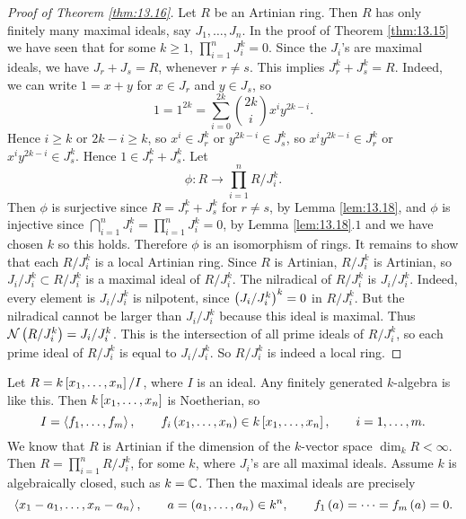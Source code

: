 \begin{proof}[Proof of Theorem \ref{thm:13.16}]
Let $ R $ be an Artinian ring. Then $ R $ has only finitely many maximal ideals, say $ J_1, \dots, J_n $. In the proof of Theorem \ref{thm:13.15} we have seen that for some $ k \ge 1 $, $ \prod_{i = 1}^n J_i^k = 0 $. Since the $ J_i $'s are maximal ideals, we have $ J_r + J_s = R $, whenever $ r \ne s $. This implies $ J_r^k + J_s^k = R $. Indeed, we can write $ 1 = x + y $ for $ x \in J_r $ and $ y \in J_s $, so
$$ 1 = 1^{2k} = \sum_{i = 0}^{2k} \binom{2k}{i}x^iy^{2k - i}. $$
Hence $ i \ge k $ or $ 2k - i \ge k $, so $ x^i \in J_r^k $ or $ y^{2k - i} \in J_s^k $, so $ x^iy^{2k - i} \in J_r^k $ or $ x^iy^{2k - i} \in J_s^k $. Hence $ 1 \in J_r^k + J_s^k $. Let
$$ \phi : R \to \prod_{i = 1}^n R / J_i^k. $$
Then $ \phi $ is surjective since $ R = J_r^k + J_s^k $ for $ r \ne s $, by Lemma \ref{lem:13.18}, and $ \phi $ is injective since $ \bigcap_{i = 1}^n J_i^k = \prod_{i = 1}^n J_i^k = 0 $, by Lemma \ref{lem:13.18}.$ 1 $ and we have chosen $ k $ so this holds. Therefore $ \phi $ is an isomorphism of rings. It remains to show that each $ R / J_i^k $ is a local Artinian ring. Since $ R $ is Artinian, $ R / J_i^k $ is Artinian, so $ J_i / J_i^k \subset R / J_i^k $ is a maximal ideal of $ R / J_i^k $. The nilradical of $ R / J_i^k $ is $ J_i / J_i^k $. Indeed, every element is $ J_i / J_i^k $ is nilpotent, since $ \br{J_i / J_i^k}^k = 0 $ in $ R / J_i^k $. But the nilradical cannot be larger than $ J_i / J_i^k $ because this ideal is maximal. Thus $ \NNN\br{R / J_i^k} = J_i / J_i^k $. This is the intersection of all prime ideals of $ R / J_i^k $, so each prime ideal of $ R / J_i^k $ is equal to $ J_i / J_i^k $. So $ R / J_i^k $ is indeed a local ring.
\end{proof}

\begin{example*}
Let $ R = k\sbr{x_1, \dots, x_n} / I $, where $ I $ is an ideal. Any finitely generated $ k $-algebra is like this. Then $ k\sbr{x_1, \dots, x_n} $ is Noetherian, so
$$ I = \abr{f_1, \dots, f_m}, \qquad f_i\br{x_1, \dots, x_n} \in k\sbr{x_1, \dots, x_n}, \qquad i = 1, \dots, m. $$
We know that $ R $ is Artinian if the dimension of the $ k $-vector space $ \dim_k R < \infty $. Then $ R = \prod_{i = 1}^n R / J_i^k $, for some $ k $, where $ J_i $'s are all maximal ideals. Assume $ k $ is algebraically closed, such as $ k = \mathbb{C} $. Then the maximal ideals are precisely
$$ \abr{x_1 - a_1, \dots, x_n - a_n}, \qquad a = \br{a_1, \dots, a_n} \in k^n, \qquad f_1\br{a} = \dots = f_m\br{a} = 0. $$
\end{example*}

